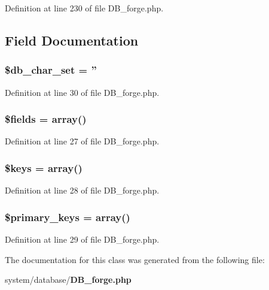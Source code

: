 Definition at line 230 of file D\-B\-\_\-forge.\-php.



\subsection{Field Documentation}
\subsubsection[{\$db\-\_\-char\-\_\-set}]{\setlength{\rightskip}{0pt plus 5cm}\$db\-\_\-char\-\_\-set = ''}\label{class_c_i___d_b__forge_a6e90c3633cd0984a7e8de501f7771c53}


Definition at line 30 of file D\-B\-\_\-forge.\-php.

\subsubsection[{\$fields}]{\setlength{\rightskip}{0pt plus 5cm}\$fields = array()}\label{class_c_i___d_b__forge_ab2303c817e3b402b77b7f99627b9c319}


Definition at line 27 of file D\-B\-\_\-forge.\-php.

\subsubsection[{\$keys}]{\setlength{\rightskip}{0pt plus 5cm}\$keys = array()}\label{class_c_i___d_b__forge_af20635b6c08e03bfee9e3fc036fa80f3}


Definition at line 28 of file D\-B\-\_\-forge.\-php.

\subsubsection[{\$primary\-\_\-keys}]{\setlength{\rightskip}{0pt plus 5cm}\$primary\-\_\-keys = array()}\label{class_c_i___d_b__forge_a09349689030ba7198a094abf357c78bc}


Definition at line 29 of file D\-B\-\_\-forge.\-php.



The documentation for this class was generated from the following file\-:\begin{DoxyCompactItemize}
\item 
system/database/{\bf D\-B\-\_\-forge.\-php}\end{DoxyCompactItemize}
